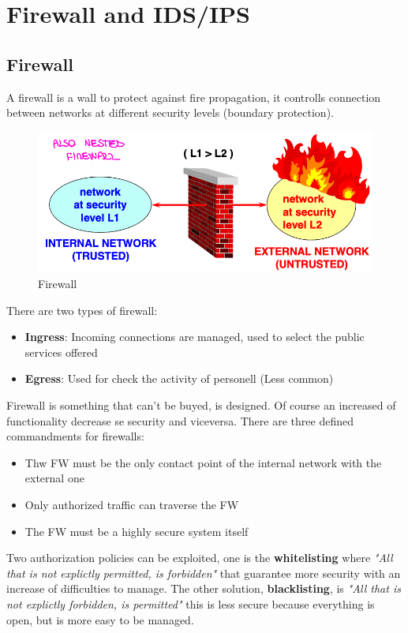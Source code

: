 \documentclass[12pt]{article}
\begin{document}
\section{Firewall and IDS/IPS}
\subsection{Firewall}
A firewall is a wall to protect against fire propagation, it controlls connection between networks at different security levels (boundary protection).
\begin{figure}[H]
   \centering
   \includegraphics[width=\linewidth]{images/firewall.png}
   \caption{Firewall}
   \label{fig:firewall}
\end{figure}
There are two types of firewall:
\begin{itemize}
  \item \textbf{Ingress}: Incoming connections are managed, used to select the public services offered
  \item \textbf{Egress}: Used for check the activity of personell (Less common)
\end{itemize}
Firewall is something that can't be buyed, is designed. Of course an increased of functionality decrease se security and viceversa. There are three defined commandments for firewalls:
\begin{itemize}
  \item Thw FW must be the only contact point of the internal network with the external one
  \item Only authorized traffic can traverse the FW
  \item The FW must be a highly secure system itself
\end{itemize}
Two authorization policies can be exploited, one is the \textbf{whitelisting} where \textit{"All that is not explictly permitted, is forbidden"} that guarantee more security with an increase of difficulties to manage. The other solution, \textbf{blacklisting}, is \textit{"All that is not explictly forbidden, is permitted"} this is less secure because everything is open, but is more easy to be managed.\\
\end{document}
